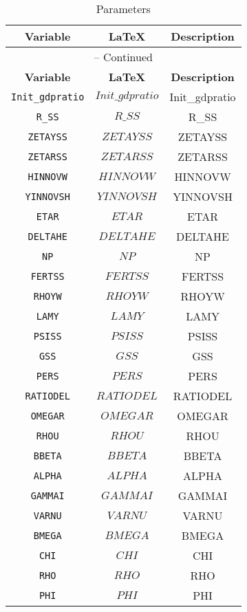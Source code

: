 \begin{center}
\begin{longtable}{ccc}
\caption{Parameters}\\%
\hline%
\multicolumn{1}{c}{\textbf{Variable}} &
\multicolumn{1}{c}{\textbf{\LaTeX}} &
\multicolumn{1}{c}{\textbf{Description}}\\%
\hline\hline%
\endfirsthead
\multicolumn{3}{c}{{\tablename} \thetable{} -- Continued}\\%
\hline%
\multicolumn{1}{c}{\textbf{Variable}} &
\multicolumn{1}{c}{\textbf{\LaTeX}} &
\multicolumn{1}{c}{\textbf{Description}}\\%
\hline\hline%
\endhead
\texttt{Init\_gdpratio} & $Init\_gdpratio$ & Init\_gdpratio\\
\texttt{R\_SS} & $R\_SS$ & R\_SS\\
\texttt{ZETAYSS} & $ZETAYSS$ & ZETAYSS\\
\texttt{ZETARSS} & $ZETARSS$ & ZETARSS\\
\texttt{HINNOVW} & $HINNOVW$ & HINNOVW\\
\texttt{YINNOVSH} & $YINNOVSH$ & YINNOVSH\\
\texttt{ETAR} & $ETAR$ & ETAR\\
\texttt{DELTAHE} & $DELTAHE$ & DELTAHE\\
\texttt{NP} & $NP$ & NP\\
\texttt{FERTSS} & $FERTSS$ & FERTSS\\
\texttt{RHOYW} & $RHOYW$ & RHOYW\\
\texttt{LAMY} & $LAMY$ & LAMY\\
\texttt{PSISS} & $PSISS$ & PSISS\\
\texttt{GSS} & $GSS$ & GSS\\
\texttt{PERS} & $PERS$ & PERS\\
\texttt{RATIODEL} & $RATIODEL$ & RATIODEL\\
\texttt{OMEGAR} & $OMEGAR$ & OMEGAR\\
\texttt{RHOU} & $RHOU$ & RHOU\\
\texttt{BBETA} & $BBETA$ & BBETA\\
\texttt{ALPHA} & $ALPHA$ & ALPHA\\
\texttt{GAMMAI} & $GAMMAI$ & GAMMAI\\
\texttt{VARNU} & $VARNU$ & VARNU\\
\texttt{BMEGA} & $BMEGA$ & BMEGA\\
\texttt{CHI} & $CHI$ & CHI\\
\texttt{RHO} & $RHO$ & RHO\\
\texttt{PHI} & $PHI$ & PHI\\

\end{longtable}
\end{center}
